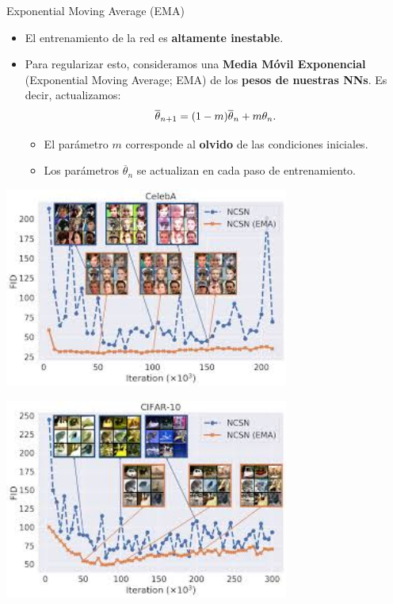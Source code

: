 \documentclass[aspectratio=169,xcolor=dvipsnames, t, spanish]{beamer}
\begin{document}
    \begin{frame}{Exponential Moving Average (EMA)}\vspace{-6mm}
        \begin{itemize}
            \item El entrenamiento de la red es \textbf{altamente inestable}.
            \pause
            \item Para regularizar esto, consideramos una \textbf{Media Móvil Exponencial} (Exponential Moving Average; EMA) de los \textbf{pesos de nuestras NNs}. Es decir, actualizamos:\vspace{-2mm}
            \[ \overline{\theta}_{n+1}=(1-m)\overline{\theta}_{n}+m\theta_{n} . \vspace{-6mm}\]
            \begin{itemize}
                \item El parámetro $m$ corresponde al \textbf{olvido} de las condiciones iniciales.
                \item Los parámetros $\overline{\theta}_{n}$ se actualizan en cada paso de entrenamiento.
            \end{itemize}
        \end{itemize}
        \begin{center}
        \begin{minipage}{0.5\textwidth}
        \begin{center}
            \includegraphics[width=0.7\textwidth]{figures/ema1.jpeg}
           \end{center} 
        \end{minipage}\begin{minipage}{0.5\textwidth}
        \begin{center}
            \includegraphics[width=0.7\textwidth]{figures/ema2.jpeg}

\end{center}
\end{minipage}
\end{center}
\end{frame}
\end{document}
